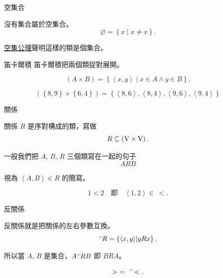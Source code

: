 \documentclass{Slideshow}
\newcommand{\mmhref}[2]{\href{http://us.metamath.org/mpeuni/#1.html}{#2}}
\begin{document}
\begin{frame}{空集合}
    \begin{definition}
        沒有集合屬於空集合。
        \[ \varnothing = \left\{ x \middle| x \ne x \right\}.\]
    \end{definition}

    \mmhref{ax-nul}{空集公理}聲明這樣的類是個集合。
\end{frame}

\begin{frame}{笛卡爾積}
    笛卡爾積把兩個類捉對展開。

    \begin{definition}
        \[
            \left( A \times B \right) =
            \left\{ \left\langle x, y \right\rangle \middle| x \in A \wedge y \in B \right\}.
        \]
    \end{definition}

    \begin{example}
        \[
            \left( \left\{ 8, 9 \right\} \times \left\{ 6, 4 \right\} \right) =
            \left\{
                \left\langle 8, 6 \right\rangle,
                \left\langle 8, 4 \right\rangle,
                \left\langle 9, 6 \right\rangle,
                \left\langle 9, 4 \right\rangle
            \right\}
        \]
    \end{example}
\end{frame}

\begin{frame}{關係}
    \begin{definition}
        關係 $R$ 是序對構成的類，寫做
        \[ R \subseteq \left( \textup V \times \textup V \right).\]

        一般我們把 $A$, $B$, $R$ 三個類寫在一起的句子
        \[ ARB \]

        視為 $\left\langle A, B \right\rangle \in R$ 的簡寫。
    \end{definition}

    \begin{example}
        \[ 1 < 2 \quad \mbox{即} \quad \left\langle 1, 2 \right\rangle \in\ < .\]
    \end{example}
\end{frame}

\begin{frame}{反關係}
    \begin{definition}
        反關係就是把關係的左右參數互換。
        \[ ^\smallsmile\! R = \left\{ \left\langle x, y \right\rangle \middle| yRx \right\}.\]
    \end{definition}

    所以當 $A$, $B$ 是集合，$A ^\smallsmile\! R B$ 即 $BRA$。

    \begin{example}
        \[ > \ = \ ^\smallsmile\!<.\]
    \end{example}
\end{frame}
\end{document}

